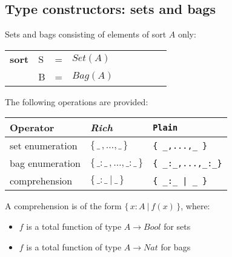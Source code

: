 \documentclass{article}
\makeatletter
\newcommand{\frm}[1]{\mbox{\ensuremath{#1}}}
\newcommand{\f}[1]{\ensuremath{\mathit{#1}}}
\newcommand{\fa}[2]{\ensuremath{\f{#1}(#2)}}
\newcommand{\To}{\ensuremath{\rightarrow}}
\newcommand{\set}[1]{\ensuremath{\{\,#1\,\}}}
\newcommand{\bag}[1]{\ensuremath{\set{#1}}}
\newcommand{\scompr}[2]{\ensuremath{\set{#1\ |\ #2}}}
\newcommand{\srtbool}{\f{Bool}}
\newcommand{\srtnat}{\f{Nat}}
\newenvironment{mCRL2}%
{\par\bigskip\noindent%
 \begin{tabular}{@{}>{\bf}p{2.3em}L@{\ }L@{\ }L@{\ }L@{\ }L@{\ }L@{\ }L@{\ }L}%
}%
{\end{tabular}\bigskip\par%
}
\makeatother
\begin{document}
\begin{slidetop}
\section*{Type constructors: sets and bags}

Sets and bags consisting of elements of sort \frm{A} only:
\begin{mCRL2}
sort & S & = & \fa{Set}{A}\\
     & B & = & \fa{Bag}{A}
\end{mCRL2}

The following operations are provided:
\begin{center}
\begin{tabular}{|l@{\qquad}L@{\qquad}l|}
\hline
Operator                       & \textit{Rich}                          & \verb+Plain+\\\hline
set enumeration                & \set{\_\,,\ldots,\_}                   & \verb+{ _,...,_ }+\\
bag enumeration                & \bag{{\_:\_}\,,\ldots,{\_:\_}}         & \verb+{ _:_,...,_:_}+\\
comprehension                  & \scompr{\_:\_}{\_}                     & \verb+{ _:_ | _ }+\\
\hline
\end{tabular}
\end{center}

\bigskip
A comprehension is of the form \frm{\scompr{x{:}A}{\fa{f}{x}}}, where:
\begin{itemize}
\item \frm{f} is a total function of type \frm{A \To \srtbool} for sets
\item \frm{f} is a total function of type \frm{A \To \srtnat} for bags
\end{itemize}
\end{slidetop}
\end{document}
